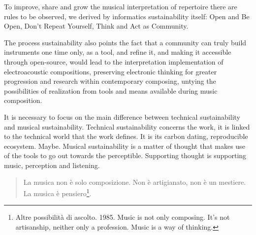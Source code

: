 \documentclass[twoside,a4paper]{article}
\begin{document}
To improve, share and grow the musical interpretation of repertoire there are rules to be observed, we derived by informatics sustainability itself: Open and Be Open, Don't Repeat Yourself, Think and Act as Community.

The process sustainability also points the fact that a community can truly build instruments one time only, as a tool, and refine it, and making it accessible through open-source, would lead to the interpretation implementation of electroacoustic compositions, preserving electronic thinking for greater progression and research within contemporary composing, untying the possibilities of realization from tools and means available during music composition.

It is necessary to focus on the main difference between technical sustainability and musical sustainability. Technical sustainability concerns the work, it is linked to the technical world that the work defines. It is its carbon dating, reproducible ecosystem. Maybe. Musical sustainability is a matter of thought that makes use of the tools to go out towards the perceptible. Supporting thought is supporting music, perception and listening.

\begin{quote}
La musica non è solo composizione. Non è artigianato, non è un mestiere. La musica è pensiero\footnote{Altre possibilità di ascolto. 1985. Music is not only composing. It’s not artisanship, neither only a profession. Music is a way of thinking.}.
\end{quote}
%

\nocite{*}

%
%
%
\end{document}
